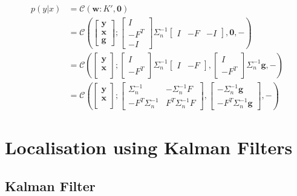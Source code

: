 \documentclass[12pt,oneside,openany,a4paper, %
afrikaans,english,
]{memoir}
\numberwithin{equation}{chapter}
\begin{document}
\begin{equation}
\begin{split}
p(y|x) & = \mathcal{C}(\bm{w}: K', \bm{0})\\
& =\mathcal{C}\left(
\begin{bmatrix}
\bm{y} \\
\bm{x} \\
\bm{g}
\end{bmatrix};
\begin{bmatrix}
I\\
-F^T\\
-I
\end{bmatrix}
\Sigma_n^{-1}
\begin{bmatrix}
I & -F & -I
\end{bmatrix}, \bm{0}, -
\right)\\
& =\mathcal{C}\left(
\begin{bmatrix}
\bm{y} \\
\bm{x} \\
\end{bmatrix};
\begin{bmatrix}
I\\
-F^T
\end{bmatrix}
\Sigma_n^{-1}
\begin{bmatrix}
I & -F
\end{bmatrix},
\begin{bmatrix}
I\\
-F^T
\end{bmatrix}
\Sigma_n^{-1}\bm{g}, -
\right)\\
& =\mathcal{C}\left(
\begin{bmatrix}
\bm{y} \\
\bm{x} \\
\end{bmatrix};
\begin{bmatrix}
\Sigma_n^{-1}  &  -\Sigma_n^{-1}F\\
-F^T\Sigma_n^{-1} & F^T\Sigma_n^{-1}F
\end{bmatrix}
, 
\begin{bmatrix}
-\Sigma_n^{-1}\bm{g}\\
-F^T\Sigma_n^{-1}\bm{g}
\end{bmatrix},
-
\right)
\end{split}
\end{equation}
\chapter{Localisation using Kalman Filters}
\section{Kalman Filter}
\end{document}
